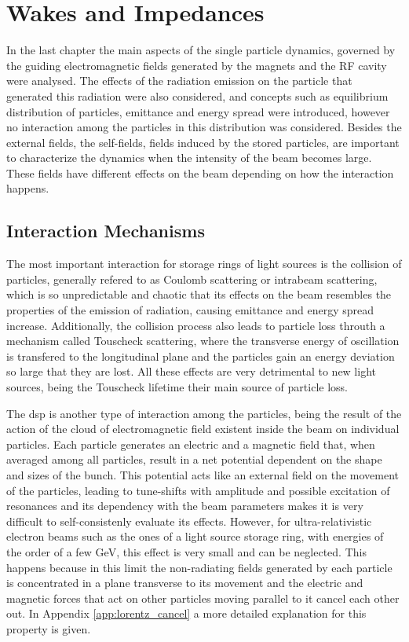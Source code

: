 \documentclass[
	12pt,				%
	openright,			%
	oneside,			%
	a4paper,		%
	chapter=TITLE,		%
	section=TITLE,		%
    brazil,				%
	english,			%
	sumario=tradicional,
	]{abntex2}
\begin{document}
\chapter{Wakes and Impedances}\label{cap:wake_impedances}

In the last chapter the main aspects of the single particle dynamics, governed by the guiding electromagnetic fields generated by the magnets and the RF cavity were analysed. The effects of the radiation emission on the particle that generated this radiation were also considered, and concepts such as equilibrium distribution of particles, emittance and energy spread were introduced, however no interaction among the particles in this distribution was considered. Besides the external fields, the self-fields, fields induced by the stored particles, are important to characterize the dynamics when the intensity of the beam becomes large. These fields have different effects on the beam depending on how the interaction happens.

  \section{Interaction Mechanisms}

  The most important interaction for storage rings of light sources is the collision of particles, generally refered to as Coulomb scattering or intrabeam scattering, which is so unpredictable and chaotic that its effects on the beam resembles the properties of the emission of radiation, causing emittance and energy spread increase. Additionally, the collision process also leads to particle loss throuth a mechanism called Touscheck scattering, where the transverse energy of oscillation is transfered to the longitudinal plane and the particles gain an energy deviation so large that they are lost. All these effects are very detrimental to new light sources, being the Touscheck lifetime their main source of particle loss.

  The \gls{dsp} is another type of interaction among the particles, being the result of the action of the cloud of electromagnetic field existent inside the beam on individual particles. Each particle generates an electric and a magnetic field that, when averaged among all particles, result in a net potential dependent on the shape and sizes of the bunch. This potential acts like an external field on the movement of the particles, leading to tune-shifts with amplitude and possible excitation of resonances and its dependency with the beam parameters makes it is very difficult to self-consistenly evaluate its effects. However, for ultra-relativistic electron beams such as the ones of a light source storage ring, with energies of the order of a few \si{\giga\electronvolt}, this effect is very small and can be neglected. This happens because in this limit the non-radiating fields generated by each particle is concentrated in a plane transverse to its movement and the electric and magnetic forces that act on other particles moving parallel to it cancel each other out. In Appendix \ref{app:lorentz_cancel} a more detailed explanation for this property is given.
\end{document}
